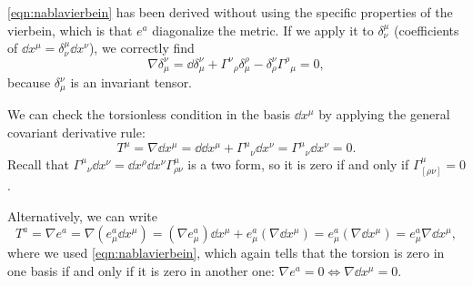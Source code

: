 \documentclass[a4paper,12pt]{book}
\begin{document}
\cref{eqn:nablavierbein} has been derived without using the specific properties of the vierbein, which is that $e^a$ diagonalize the metric. If we apply it to $\delta^\mu_\nu$ (coefficients of $\dd x^\mu=\delta^\mu_\nu\dd x^\nu$), we correctly find
\[\nabla\delta^\nu_\mu=\dd\delta^\nu_\mu+\Gamma^\nu{}_\rho\delta^\rho_\mu-\delta^\nu_\rho\Gamma^\rho{}_\mu=0,\]
because $\delta^\nu_\mu$ is an invariant tensor.

We can check the torsionless condition in the basis $\dd x^\mu$ by applying the general covariant derivative rule:
\[T^\mu=\nabla\dd x^\mu=\dd\dd x^\mu+\Gamma^\mu{}_\nu\dd x^\nu=\Gamma^\mu{}_\nu\dd x^\nu=0.\]
Recall that $\Gamma^\mu{}_\nu\dd x^\nu=\dd x^\rho\dd x^\nu\Gamma^\mu_{\rho\nu}$ is a two form, so it is zero if and only if $\Gamma^\mu_{[\rho\nu]}=0$.

Alternatively, we can write
\[T^a=\nabla e^a=\nabla(e^a_\mu\dd x^\mu)=(\nabla e^a_\mu)\dd x^\mu+e^a_\mu(\nabla\dd x^\mu)=e^a_\mu(\nabla\dd x^\mu)=e^a_\mu\nabla\dd x^\mu,\]
where we used \cref{eqn:nablavierbein}, which again tells that the torsion is zero in one basis if and only if it is zero in another one: $\nabla e^a=0\iff\nabla\dd x^\mu=0$.
\end{document}
